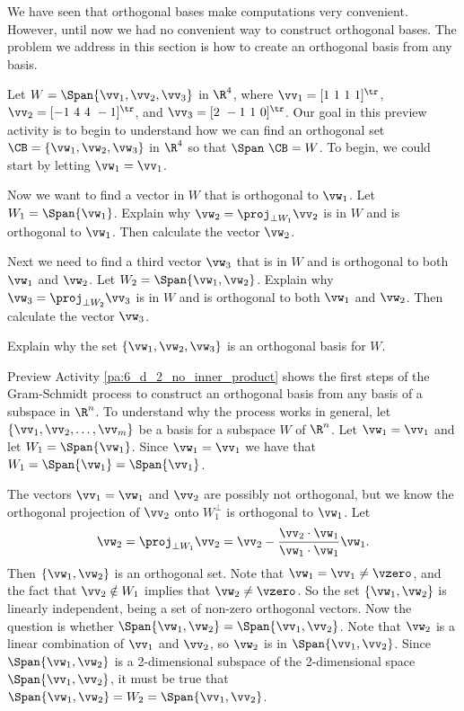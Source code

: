 \label{sec:gram_schmidt_process}
We have seen that orthogonal bases make computations very convenient. However, until now we had no convenient way to construct orthogonal bases. The problem we address in this section is how to create an orthogonal basis from any basis.  

\begin{pa} \label{pa:6_d_2_no_inner_product}  Let $W = \Span \{\vv_1, \vv_2, \vv_3\}$ in $\R^4$, where $\vv_1 = [1 \ 1 \ 1 \ 1]^{\tr}$, $\vv_2 = [-1 \ 4 \ 4 \ -1]^{\tr}$, and $\vv_3 = [2 \ -1 \ 1 \ 0]^{\tr}$. Our goal in this preview activity is to begin to understand how we can find an orthogonal set $\CB = \{\vw_1, \vw_2, \vw_3\}$ in $\R^4$ so that $\Span \ \CB = W$. To begin, we could start by letting $\vw_1 = \vv_1$. 
	\be
	\item Now we want to find a vector in $W$ that is orthogonal to $\vw_1$. Let $W_1 = \Span\{\vw_1\}$. Explain why $\vw_2 = \proj_{\perp W_1} \vv_2$ is in $W$ and is orthogonal to $\vw_1$. Then calculate the vector $\vw_2$.  


	\item Next we need to find a third vector $\vw_3$ that is in $W$ and is orthogonal to both $\vw_1$ and $\vw_2$. Let $W_2 = \Span \{\vw_1, \vw_2\}$. Explain why $\vw_3 = \proj_{\perp W_2} \vv_3$ is in $W$ and is orthogonal to both $\vw_1$ and $\vw_2$. Then calculate the vector $\vw_3$.  

	\item Explain why the set $\{\vw_1, \vw_2, \vw_3\}$ is an orthogonal basis for $W$. 


	\ee
	
\end{pa}

Preview Activity \ref{pa:6_d_2_no_inner_product} shows the first steps of the Gram-Schmidt process to construct an orthogonal basis from any basis of a subspace in $\R^n$. To understand why the process works in general, let $\{\vv_1, \vv_2, \ldots, \vv_m\}$ be a basis for a subspace $W$ of $\R^n$. Let $\vw_1 = \vv_1$ and let $W_1 = \Span\{\vw_1\}$. Since $\vw_1 = \vv_1$ we have that $W_1 = \Span\{\vw_1\} = \Span\{\vv_1\}$. 

The vectors $\vv_1 = \vw_1$ and $\vv_2$ are possibly not orthogonal, but we know the orthogonal projection of $\vv_2$ onto $W_1^{\perp}$ is orthogonal to $\vw_1$. Let
\[\vw_2 = \proj_{\perp W_1} \vv_2 = \vv_2 -  \frac{ \vv_2 \cdot \vw_1 }{ \vw_1 \cdot  \vw_1 } \vw_1.\]
Then $\{\vw_1, \vw_2\}$ is an orthogonal set. Note that $\vw_1 = \vv_1 \neq \vzero$, and the fact that $\vv_2 \notin W_1$ implies that $\vw_2 \neq \vzero$. So the set $\{\vw_1, \vw_2\}$ is linearly independent, being a set of non-zero orthogonal vectors. Now the question is whether $\Span\{\vw_1,\vw_2\} = \Span\{\vv_1,\vv_2\}$. Note that $\vw_2$ is a linear combination of $\vv_1$ and $\vv_2$, so $\vw_2$ is in $\Span\{\vv_1,\vv_2\}$. Since $\Span\{\vw_1,\vw_2\}$ is a 2-dimensional subspace of the 2-dimensional space $\Span\{\vv_1,\vv_2\}$, it must be true that $\Span\{\vw_1,\vw_2\} = W_2 = \Span\{\vv_1,\vv_2\}$.

